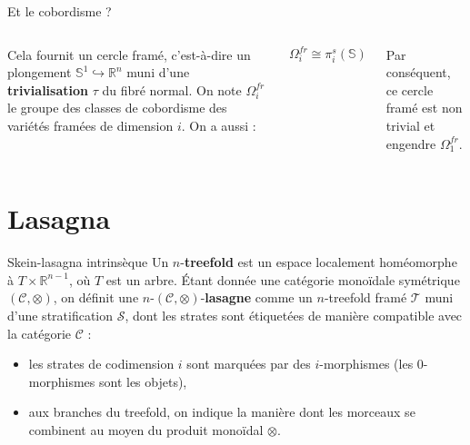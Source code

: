 \documentclass[12pt]{beamer}
\begin{document}
\begin{frame}{Et le cobordisme ?}
\begin{columns}
\pause
{}
Cela fournit un cercle framé, c’est-à-dire un plongement $\mathbb{S}^1 \hookrightarrow \mathbb{R}^n$ muni d’une \textbf{trivialisation} $\tau$ du fibré normal. On note $\Omega^{fr}_i$ le groupe des classes de cobordisme des variétés framées de dimension $i$. \pause On a aussi :

\[
  \Omega^{fr}_i \cong \pi^s_i(\mathbb{S}) 
\]

Par conséquent, ce cercle framé est non trivial et engendre $\Omega^{fr}_1$.

\end{columns}
\end{frame}
\section{Lasagna}
\begin{frame}{Skein-lasagna intrinsèque}
  Un $n$-\textbf{treefold} est un espace localement homéomorphe à $T\times \mathbb{R}^{n-1}$, où $T$ est un arbre. \pause
  Étant donnée une catégorie monoïdale symétrique $(\mathcal{C},\otimes)$, on définit une $n$-$(\mathcal{C},\otimes)$-\textbf{lasagne} comme un $n$-treefold framé $\mathcal{T}$ muni d’une stratification $\mathcal{S}$, dont les strates sont étiquetées de manière compatible avec la catégorie $\mathcal{C}$ :
  \pause
  \begin{itemize}
    \item les strates de codimension $i$ sont marquées par des $i$-morphismes (les $0$-morphismes sont les objets),
    \item aux branches du treefold, on indique la manière dont les morceaux se combinent au moyen du produit monoïdal $\otimes$.
  \end{itemize}

   \begin{center}
    



\begin{tikzpicture}[x=0.75pt,y=0.75pt,yscale=-1,xscale=1]


\end{tikzpicture}
\end{center}
\end{frame}
\end{document}
